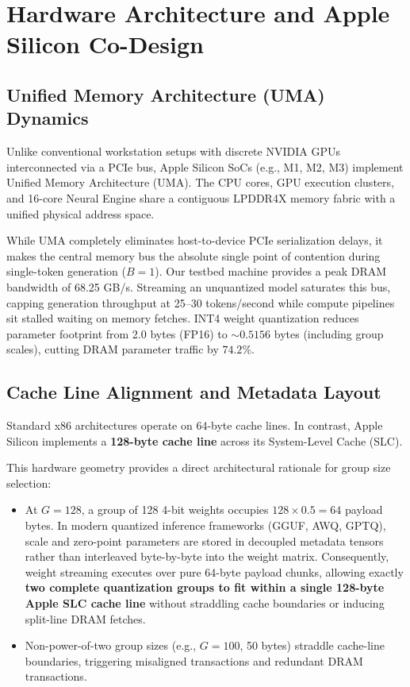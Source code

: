 \documentclass[conference]{IEEEtran}
\begin{document}
\section{Hardware Architecture and Apple Silicon Co-Design}

\subsection{Unified Memory Architecture (UMA) Dynamics}
Unlike conventional workstation setups with discrete NVIDIA GPUs interconnected via a PCIe bus, Apple Silicon SoCs (e.g., M1, M2, M3) implement Unified Memory Architecture (UMA). The CPU cores, GPU execution clusters, and 16-core Neural Engine share a contiguous LPDDR4X memory fabric with a unified physical address space.

While UMA completely eliminates host-to-device PCIe serialization delays, it makes the central memory bus the absolute single point of contention during single-token generation ($B=1$). Our testbed machine provides a peak DRAM bandwidth of 68.25 GB/s. Streaming an unquantized model saturates this bus, capping generation throughput at 25--30 tokens/second while compute pipelines sit stalled waiting on memory fetches. INT4 weight quantization reduces parameter footprint from 2.0 bytes (FP16) to $\sim 0.5156$ bytes (including group scales), cutting DRAM parameter traffic by $74.2\%$.

\subsection{Cache Line Alignment and Metadata Layout}
Standard x86 architectures operate on 64-byte cache lines. In contrast, Apple Silicon implements a \textbf{128-byte cache line} across its System-Level Cache (SLC).

This hardware geometry provides a direct architectural rationale for group size selection:
\begin{itemize}
    \item At $G=128$, a group of 128 4-bit weights occupies $128 \times 0.5 = 64$ payload bytes. In modern quantized inference frameworks (GGUF, AWQ, GPTQ), scale and zero-point parameters are stored in decoupled metadata tensors rather than interleaved byte-by-byte into the weight matrix. Consequently, weight streaming executes over pure 64-byte payload chunks, allowing exactly \textbf{two complete quantization groups to fit within a single 128-byte Apple SLC cache line} without straddling cache boundaries or inducing split-line DRAM fetches.
    \item Non-power-of-two group sizes (e.g., $G=100$, 50 bytes) straddle cache-line boundaries, triggering misaligned transactions and redundant DRAM transactions.
\end{itemize}
\end{document}

